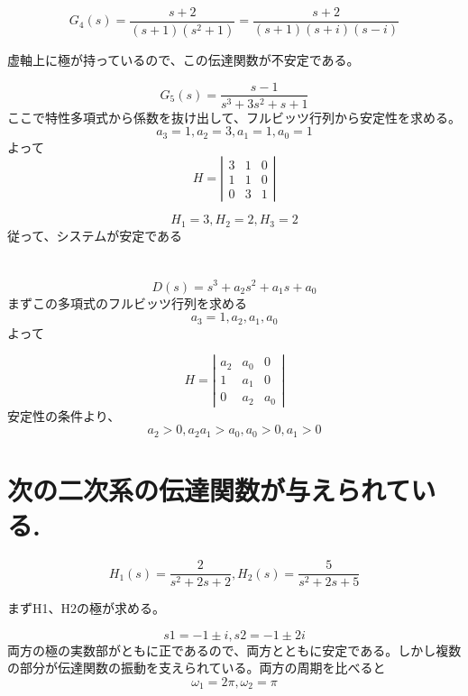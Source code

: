 \documentclass[xelatex,ja=standard,jafont=noto]{bxjsarticle}
\begin{document}
		 \[  G_{4}(s)=\frac{s+2}{(s+1)(s^{2}+1)}=\frac{s+2}{(s+1)(s+i)(s-i)}  \]
		 
		 虚軸上に極が持っているので、この伝達関数が不安定である。
		 
		  \begin{equation}
		 G_{5}(s)=\frac{s-1}{s^{3}+3s^{2}+s+1}
		 \end{equation}
		 ここで特性多項式から係数を抜け出して、フルビッツ行列から安定性を求める。
		  \[  a_{3}=1,a_{2}=3,a_{1}=1,a_{0}=1  \]
		  よって
		  \[ H=
		  \left|\begin{array}{cccc} 
		  3 &    1    & 0 \\ 
		  1 &    1    & 0 \\ 
		  0 &    3    & 1 
		  \end{array}\right| 
		  \]
		  
		  \[  H_{1}=3,H_{2}=2,H_{3}=2  \]
		  従って、システムが安定である
		 
		 \section{}
		 
		 \[ D(s)=s^{3}+a_{2}s^{2}+a_{1}s+a_{0}  \]
		 まずこの多項式のフルビッツ行列を求める
		  \[ a_{3}=1,a_{2},a_{1},a_{0}  \]
		  よって
		  
		\begin{equation}
	H=
	\left|\begin{array}{cccc} 
	a_{2} &    a_{0}    & 0 \\ 
	1 &    a_{1}    & 0 \\ 
	0 &    a_{2}   & a_{0} 
	\end{array}\right| 
	    \end{equation}
	 安定性の条件より、   
	   \[  a_{2}>0,a_{2}a_{1}>a_{0},a_{0}>0,a_{1}>0  \]
	    
	    
	    \section{次の二次系の伝達関数が与えられている.}
	    
	\[  H_{1}(s)=\frac{2}{s^{2}+2s+2},H_{2}(s)=\frac{5}{s^{2}+2s+5} \]
		
	まずH1、H2の極が求める。
		 
	\[  s1=-1\pm i,s2=-1\pm 2i \]
	両方の極の実数部がともに正であるので、両方とともに安定である。しかし複数の部分が伝達関数の振動を支えられている。両方の周期を比べると
		 \[  \omega_{1}=2\pi,\omega_{2}=\pi \]
		 
\end{document}
